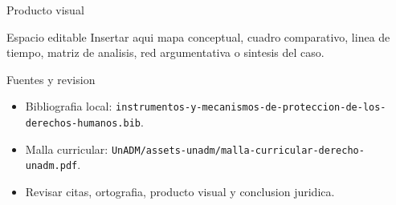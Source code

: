 \documentclass[
  spanish,
  aspectratio=169,
  xcolor={dvipsnames,table}
]{beamer}
\begin{document}
\begin{frame}{Producto visual}
  \begin{block}{Espacio editable}
    Insertar aqui mapa conceptual, cuadro comparativo, linea de tiempo,
    matriz de analisis, red argumentativa o sintesis del caso.
  \end{block}
  \centering
\end{frame}

\begin{frame}{Fuentes y revision}
  \begin{itemize}
    \item Bibliografia local: \texttt{instrumentos-y-mecanismos-de-proteccion-de-los-derechos-humanos.bib}.
    \item Malla curricular: \texttt{UnADM/assets-unadm/malla-curricular-derecho-unadm.pdf}.
    \item Revisar citas, ortografia, producto visual y conclusion juridica.
  \end{itemize}
\end{frame}
\end{document}
